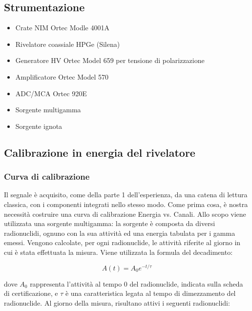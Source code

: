 \documentclass[a4paper,10pt]{article}
\begin{document}

\subsection{Strumentazione}
\begin{itemize}
\item Crate NIM Ortec Modle 4001A
\item Rivelatore coassiale HPGe (Silena)
\item Generatore HV Ortec Model 659 per tensione di polarizzazione
\item Amplificatore Ortec Model 570
\item ADC/MCA Ortec 920E
\item Sorgente multigamma
\item Sorgente ignota
\end{itemize}
\subsection{Calibrazione in energia del rivelatore}

 
\subsubsection{Curva di calibrazione}
Il segnale \`e acquisito, come della parte 1 dell'esperienza, da una catena di lettura classica, con i componenti integrati nello stesso modo. Come prima cosa, \`e nostra necessit\`a costruire una curva di calibrazione Energia vs. Canali. Allo scopo viene utilizzata una sorgente multigamma: la sorgente \`e composta da diversi radionuclidi, ognuno con la sua attivit\`a ed una energia tabulata per i gamma emessi. Vengono calcolate, per ogni radionuclide, le attività riferite al giorno in cui \`e stata effettuata la misura. Viene utilizzata la formula del decadimento:

\begin{equation}
	A(t)=A_{0}e^{-t/\tau}
\end{equation}

\noindent dove $A_{0}$ rappresenta l'attivit\`a al tempo 0 del radionuclide, indicata sulla scheda di certificazione, e $\tau$ \`e una caratteristica legata al tempo di dimezzamento del radionuclide. Al giorno della misura, risultano attivi i seguenti radionuclidi:
\end{document}
